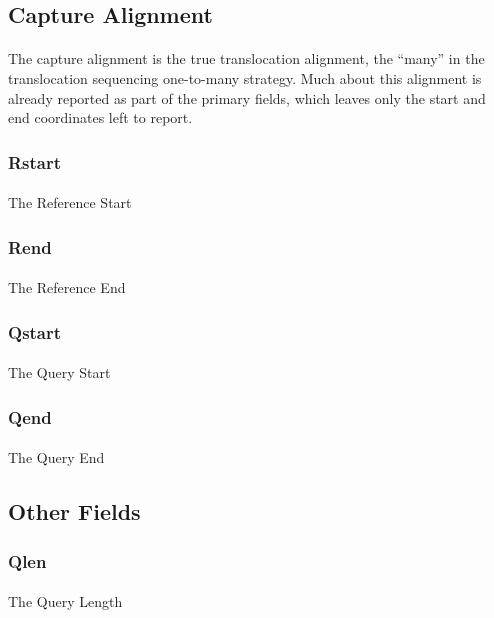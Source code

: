 \documentclass{article}
\begin{document}
\subsection{Capture Alignment}
\paragraph{} The capture alignment is the true translocation alignment, the ``many'' in the translocation sequencing one-to-many strategy. Much about this alignment is already reported as part of the primary fields, which leaves only the start and end coordinates left to report.
\subsubsection*{Rstart}
\paragraph{} The Reference Start
\subsubsection*{Rend}
\paragraph{} The Reference End
\subsubsection*{Qstart}
\paragraph{} The Query Start
\subsubsection*{Qend}
\paragraph{} The Query End


\subsection{Other Fields}
\subsubsection*{Qlen}
\paragraph{} The Query Length
\end{document}
